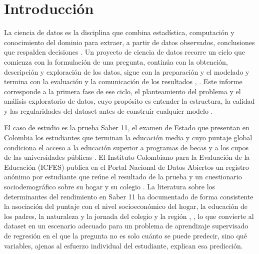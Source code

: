 \section{Introducción}
    La ciencia de datos es la disciplina que combina estadística, computación y
    conocimiento del dominio para extraer, a partir de datos observados,
    conclusiones que respalden decisiones \cite{castro2026proyecto}. Un proyecto 
    de ciencia de datos recorre un ciclo que comienza con la formulación de una 
    pregunta, continúa con la obtención, descripción y exploración de los datos, 
    sigue con la preparación y el modelado y termina con la evaluación y la 
    comunicación de los resultados \cite{castro2026proyecto}, 
    \cite{chapman2000crisp}. Este informe corresponde a la primera fase de ese 
    ciclo, el planteamiento del problema y el análisis exploratorio de datos, 
    cuyo propósito es entender la estructura, la calidad y las regularidades 
    del dataset antes de construir cualquier modelo \cite{tukey1977exploratory}.

    \vspace{10pt}

    El caso de estudio es la prueba Saber 11, el examen de Estado que presentan en
    Colombia los estudiantes que terminan la educación media y cuyo puntaje global
    condiciona el acceso a la educación superior a programas de becas y a los
    cupos de las universidades públicas \cite{icfes2022guia}. El Instituto
    Colombiano para la Evaluación de la Educación (ICFES) publica en el Portal
    Nacional de Datos Abiertos un registro anónimo por estudiante que reúne el
    resultado de la prueba y un cuestionario sociodemográfico sobre su hogar y su
    colegio \cite{icfes2023resultados}. La literatura sobre los determinantes del
    rendimiento en Saber 11 ha documentado de forma consistente la asociación del
    puntaje con el nivel socioeconómico del hogar, la educación de los padres, la
    naturaleza y la jornada del colegio y la región \cite{gaviria2001determinantes},
    \cite{chica2010determinantes}, lo que convierte al dataset en un escenario
    adecuado para un problema de aprendizaje supervisado de regresión en el que 
    la pregunta no es solo cuánto se puede predecir, sino qué variables, ajenas al
    esfuerzo individual del estudiante, explican esa predicción.

    \vspace{10pt}

